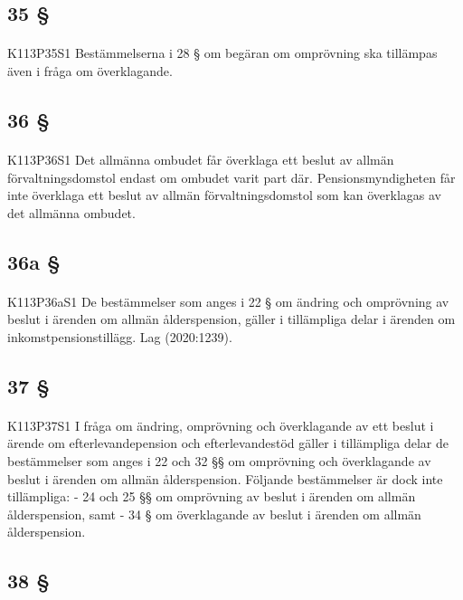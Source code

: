 \documentclass[a4paper,notitlepage,openany,10pt]{book}
\begin{document}
\subsection*{35 §}
\paragraph*{}
{\tiny K113P35S1}
Bestämmelserna i 28 § om begäran om omprövning ska tillämpas även i fråga om överklagande.
\subsection*{36 §}
\paragraph*{}
{\tiny K113P36S1}
Det allmänna ombudet får överklaga ett beslut av allmän förvaltningsdomstol endast om ombudet varit part där.
Pensionsmyndigheten får inte överklaga ett beslut av allmän förvaltningsdomstol som kan överklagas av det allmänna ombudet.
\subsection*{36a §}
\paragraph*{}
{\tiny K113P36aS1}
De bestämmelser som anges i 22 § om ändring och omprövning av beslut i ärenden om allmän ålderspension, gäller i tillämpliga delar i ärenden om inkomstpensionstillägg.
Lag (2020:1239).
\subsection*{37 §}
\paragraph*{}
{\tiny K113P37S1}
I fråga om ändring, omprövning och överklagande av ett beslut i ärende om efterlevandepension och efterlevandestöd gäller i tillämpliga delar de bestämmelser som anges i 22 och 32 §§ om omprövning och överklagande av beslut i ärenden om allmän ålderspension. Följande bestämmelser är dock inte tillämpliga:
\newline - 24 och 25 §§ om omprövning av beslut i ärenden om allmän ålderspension, samt
\newline - 34 § om överklagande av beslut i ärenden om allmän ålderspension.
\subsection*{38 §}
\end{document}
